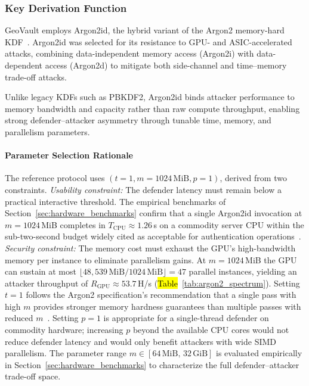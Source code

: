 \documentclass[mathematics,article,accept,pdftex,moreauthors]{Definitions/mdpi}
\begin{document}
\subsubsection{Key Derivation Function}
\label{sec:argon2_parameters}

GeoVault employs Argon2id, the hybrid variant of the Argon2 memory-hard KDF~\cite{7467361}. Argon2id was selected for its resistance to GPU- and ASIC-accelerated attacks, combining data-independent memory access (Argon2i) with data-dependent access (Argon2d) to mitigate both side-channel and time--memory trade-off attacks.

Unlike legacy KDFs such as PBKDF2, Argon2id binds attacker performance to memory bandwidth and capacity rather than raw compute throughput, enabling strong defender--attacker asymmetry through tunable time, memory, and parallelism parameters.

\paragraph*{Parameter Selection Rationale} 

{The reference protocol uses $(t=1, m=1024\,\text{MiB}, p=1)$, derived from two constraints. \emph{Usability constraint:} The defender latency must remain below a practical interactive threshold. The empirical benchmarks of Section~\ref{sec:hardware_benchmarks} confirm that a single Argon2id invocation at $m=1024$\,MiB completes in $T_\text{CPU} \approx 1.26$\,s on a commodity server CPU within the sub-two-second budget widely cited as acceptable for authentication operations~\cite{nielsen1994usability}. \emph{Security constraint:} The memory cost must exhaust the GPU's high-bandwidth memory per instance to eliminate parallelism gains. At $m=1024$\,MiB the GPU can sustain at most $\lfloor 48{,}539\,\text{MiB}/1024\,\text{MiB} \rfloor = 47$ parallel instances, yielding an attacker throughput of $R_\text{GPU} \approx 53.7$\,H/s (\hl{Table}~\ref{tab:argon2_spectrum}).  %
Setting $t=1$ follows the Argon2 specification's recommendation that a single pass with high $m$ provides stronger memory hardness guarantees than multiple passes with reduced $m$~\cite{7467361}. Setting $p=1$ is appropriate for a single-thread defender on commodity hardware; increasing $p$ beyond the available CPU cores would not reduce defender latency and would only benefit attackers with wide SIMD parallelism. The parameter range $m \in [64\,\text{MiB},\, 32\,\text{GiB}]$ is evaluated empirically in Section~\ref{sec:hardware_benchmarks} to characterize the full defender--attacker trade-off space.}
\end{document}
